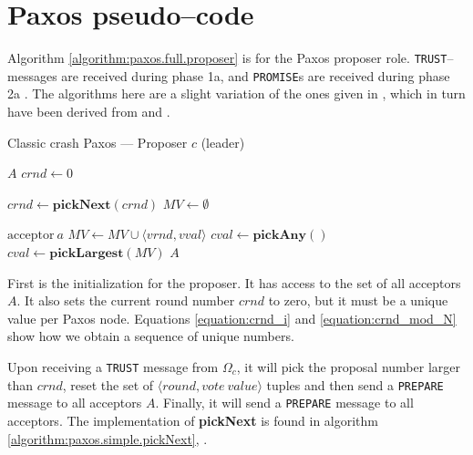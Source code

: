 \section{Paxos pseudo--code}

Algorithm \ref{algorithm:paxos.full.proposer} is for the Paxos proposer
role.  \texttt{TRUST}--messages are received during phase 1a, and
\texttt{PROMISE}s are received during phase 2a \cite{Lam01}.  The algorithms
here are a slight variation of the ones given in \cite{Insane.Paxos}, which
in turn have been derived from \cite{renesse.paxos} and \cite{Lam01}.

\begin{algorithm}
  \caption{Classic crash Paxos --- Proposer $c$ (leader)}
  \label{algorithm:paxos.full.proposer}
  \begin{algorithmic}

    \State $A$ 
    \State $crnd \gets 0$ 
    \State

      \State $crnd \gets \textbf{pickNext}(crnd)$ 
      \State $MV \gets \emptyset$ 
      \State {}
    \EndOn
    \State

       {$\text{acceptor}\ a$} 
        \State $MV \gets MV \cup \langle vrnd, vval \rangle$
            \State $cval \gets \textbf{pickAny}()$
          \Else
            \State $cval \gets \textbf{pickLargest}(MV)$
          \EndIf
         \State {}
                       {$A$}
        \EndIf
      \EndIf
    \EndOn

  \end{algorithmic}
\end{algorithm}

First is the initialization for the proposer. It has access to the set of
all acceptors $A$.  It also sets the current round number $crnd$ to
zero, but it must be a unique value per Paxos node.
Equations \ref{equation:crnd_i} and \ref{equation:crnd_mod_N} show how we
obtain a sequence of unique numbers.

Upon receiving a \texttt{TRUST} message from $\Omega_c$, it will pick the
proposal number larger than $crnd$, reset the set of
$\langle round, vote~value\rangle$ tuples and then send a
\texttt{PREPARE} message to all acceptors $A$.  Finally, it will
send a \texttt{PREPARE} message to all acceptors.
%
The implementation of \textbf{pickNext} is found in
algorithm \ref{algorithm:paxos.simple.pickNext},
.

